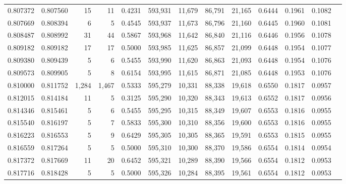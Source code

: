 \begin{tabular}{rrrrrrrrrrrrr}
0.807372 & 0.807560 &     15 &    11 &                                     0.4231 & 593,931 &  11,679 &  86,791 &  21,165 & 0.6444 & 0.1961 & 0.1082 \\
0.807669 & 0.808394 &      6 &     5 &                                     0.4545 & 593,937 &  11,673 &  86,796 &  21,160 & 0.6445 & 0.1960 & 0.1081 \\
0.808487 & 0.808992 &     31 &    44 &                                     0.5867 & 593,968 &  11,642 &  86,840 &  21,116 & 0.6446 & 0.1956 & 0.1078 \\
0.809182 & 0.809182 &     17 &    17 &                                     0.5000 & 593,985 &  11,625 &  86,857 &  21,099 & 0.6448 & 0.1954 & 0.1077 \\
0.809380 & 0.809439 &      5 &     6 &                                     0.5455 & 593,990 &  11,620 &  86,863 &  21,093 & 0.6448 & 0.1954 & 0.1076 \\
0.809573 & 0.809905 &      5 &     8 &                                     0.6154 & 593,995 &  11,615 &  86,871 &  21,085 & 0.6448 & 0.1953 & 0.1076 \\
0.810000 & 0.811752 &  1,284 & 1,467 &                                     0.5333 & 595,279 &  10,331 &  88,338 &  19,618 & 0.6550 & 0.1817 & 0.0957 \\
0.812015 & 0.814184 &     11 &     5 &                                     0.3125 & 595,290 &  10,320 &  88,343 &  19,613 & 0.6552 & 0.1817 & 0.0956 \\
0.814346 & 0.815461 &      5 &     6 &                                     0.5455 & 595,295 &  10,315 &  88,349 &  19,607 & 0.6553 & 0.1816 & 0.0955 \\
0.815540 & 0.816197 &      5 &     7 &                                     0.5833 & 595,300 &  10,310 &  88,356 &  19,600 & 0.6553 & 0.1816 & 0.0955 \\
0.816223 & 0.816553 &      5 &     9 &                                     0.6429 & 595,305 &  10,305 &  88,365 &  19,591 & 0.6553 & 0.1815 & 0.0955 \\
0.816559 & 0.817264 &      5 &     5 &                                     0.5000 & 595,310 &  10,300 &  88,370 &  19,586 & 0.6554 & 0.1814 & 0.0954 \\
0.817372 & 0.817669 &     11 &    20 &                                     0.6452 & 595,321 &  10,289 &  88,390 &  19,566 & 0.6554 & 0.1812 & 0.0953 \\
0.817716 & 0.818428 &      5 &     5 &                                     0.5000 & 595,326 &  10,284 &  88,395 &  19,561 & 0.6554 & 0.1812 & 0.0953 \\

\end{tabular}
